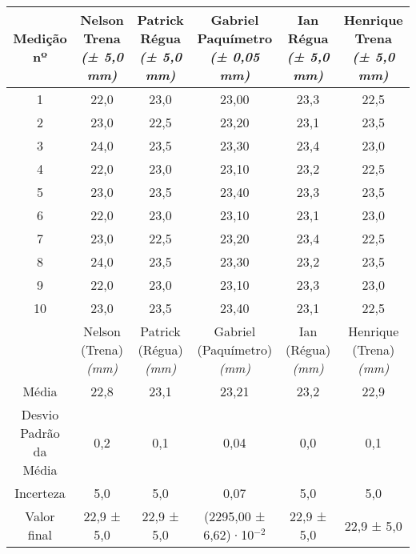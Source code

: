 \documentclass{article}
\begin{document}
\begin{table}[h!]
\centering
\begin{tabular}{c c c c c c }
\toprule
Medição nº & \shortstack{Nelson\\Trena\\\textit{(± 5,0 mm)}} & \shortstack{Patrick\\Régua\\\textit{(± 5,0 mm)}} & \shortstack{Gabriel\\Paquímetro\\\textit{(± 0,05 mm)}} & \shortstack{Ian\\Régua\\\textit{(± 5,0 mm)}} & \shortstack{Henrique\\Trena\\\textit{(± 5,0 mm)}}\\
\midrule
1 & 22,0 & 23,0 & 23,00 & 23,3 & 22,5\\
2 & 23,0 & 22,5 & 23,20 & 23,1 & 23,5\\
3 & 24,0 & 23,5 & 23,30 & 23,4 & 23,0\\
4 & 22,0 & 23,0 & 23,10 & 23,2 & 22,5\\
5 & 23,0 & 23,5 & 23,40 & 23,3 & 23,5\\
6 & 22,0 & 23,0 & 23,10 & 23,1 & 23,0\\
7 & 23,0 & 22,5 & 23,20 & 23,4 & 22,5\\
8 & 24,0 & 23,5 & 23,30 & 23,2 & 23,5\\
9 & 22,0 & 23,0 & 23,10 & 23,3 & 23,0\\
10 & 23,0 & 23,5 & 23,40 & 23,1 & 22,5\\
\midrule
&\shortstack{Nelson\\(Trena)\\\textit{(mm)}} & \shortstack{Patrick\\(Régua)\\\textit{(mm)}} & \shortstack{Gabriel\\(Paquímetro)\\\textit{(mm)}} & \shortstack{Ian\\(Régua)\\\textit{(mm)}} & \shortstack{Henrique\\(Trena)\\\textit{(mm)}}\\
\midrule
Média & 22,8 & 23,1 & 23,21 & 23,2 & 22,9\\[3pt]
\shortstack{Desvio\\Padrão da\\Média} & 0,2 & 0,1 & 0,04 & 0,0 & 0,1\\[3pt]
Incerteza & 5,0 & 5,0 & 0,07 & 5,0 & 5,0\\[3pt]
Valor final & 22,9 ± 5,0 & 22,9 ± 5,0 & (2295,00 ± 6,62)·10$^{-2}$ & 22,9 ± 5,0 & 22,9 ± 5,0\\[3pt]
\bottomrule
\end{tabular}
\end{table}
\end{document}
